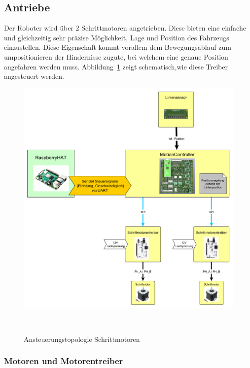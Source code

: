 \documentclass[main.tex]{subfiles} %
\begin{document}

\subsection{Antriebe}

Der Roboter wird über 2 Schrittmotoren angetrieben. Diese bieten eine einfache
und gleichzeitig sehr präzise Möglichkeit, Lage und Position des Fahrzeugs
einzustellen. Diese Eigenschaft kommt vorallem dem Bewegungsablauf zum
umpositionieren der Hindernisse zugute, bei welchem eine genaue Position
angefahren werden muss.
Abbildung~\ref{Ansteuerungstopologie_Schrittmotorentreiber} zeigt
schematisch,wie diese Treiber angesteuert werden.

\begin{figure}[H]
    \centering
    \includegraphics[width = 1\linewidth]{./fig_Antriebe/Konzept_Motoransteuerung.pdf}
    \caption{Ansteuerungstopologie Schrittmotoren}~\label{Ansteuerungstopologie_Schrittmotorentreiber}
\end{figure}


\subsubsection*{Motoren und Motorentreiber}
\end{document}
